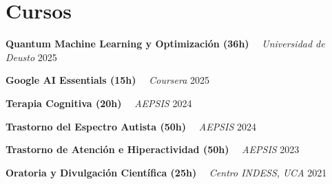 \documentclass[letterpaper,11pt]{article}
\begin{document}
\section{Cursos}
    \noindent
    \begin{minipage}[t]{1.0\linewidth}
        {\textbf{Quantum Machine Learning y Optimización (36h)}} 
        \ \textendash \ 
        {\color{detailgray}\textit{Universidad de Deusto}}
        \hfill 
        {\small 2025}
    \end{minipage}
    \par 
    \vspace{0.1cm} 
    \noindent
    \begin{minipage}[t]{1.0\linewidth}
        {\textbf{Google AI Essentials (15h)}} 
        \ \textendash \ 
        {\color{detailgray}\textit{Coursera}}
        \hfill 
        {\small 2025}
    \end{minipage}
    \par 
    \vspace{0.1cm} 
    \noindent
    \begin{minipage}[t]{1.0\linewidth}
        {\textbf{Terapia Cognitiva (20h)}} 
        \ \textendash \ 
        {\color{detailgray}\textit{AEPSIS}}
        \hfill 
        {\small 2024}
    \end{minipage}
    \par 
    \vspace{0.1cm} 
    \noindent
    \begin{minipage}[t]{1.0\linewidth}
        {\textbf{Trastorno del Espectro Autista (50h)}} 
        \ \textendash \ 
        {\color{detailgray}\textit{AEPSIS}}
        \hfill 
        {\small 2024}
    \end{minipage}
    \par 
    \vspace{0.1cm} 
    \noindent
    \begin{minipage}[t]{1.0\linewidth}
        {\textbf{Trastorno de Atención e Hiperactividad (50h)}} 
        \ \textendash \ 
        {\color{detailgray}\textit{AEPSIS}}
        \hfill 
        {\small 2023}
    \end{minipage}
    \par 
    \vspace{0.1cm} 
    \noindent
    \begin{minipage}[t]{1.0\linewidth}
        {\textbf{Oratoria y Divulgación Científica (25h)}} 
        \ \textendash \ 
        {\color{detailgray}\textit{Centro INDESS, UCA}}
        \hfill 
        {\small 2021}
    \end{minipage}
    \par 
    \vspace{0.1cm} 
\end{document}
